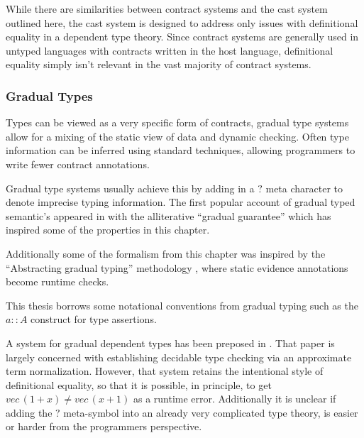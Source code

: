 While there are similarities between contract systems and the cast
system outlined here, the cast system is designed to address only
issues with definitional equality in a dependent type theory. Since
contract systems are generally used in untyped languages with contracts
written in the host language, definitional equality simply isn't relevant
in the vast majority of contract systems.

\subsubsection{Gradual Types}

Types can be viewed as a very specific form of contracts, gradual
type systems allow for a mixing of the static view of data and dynamic
checking. Often type information can be inferred using standard techniques,
allowing programmers to write fewer contract annotations. %

Gradual type systems usually achieve this by adding in a $?$ meta
character to denote imprecise typing information. The first popular
account of gradual typed semantic's appeared in \cite{siek_et_al:LIPIcs:2015:5031}
with the alliterative ``gradual guarantee'' which has inspired some
of the properties in this chapter.



Additionally some of the formalism from this chapter was inspired
by the ``Abstracting gradual typing'' methodology \cite{10.1145/2837614.2837670},
where static evidence annotations become runtime checks. %

This thesis borrows some notational conventions from gradual typing
such as the $a::A$ construct for type assertions.

A system for gradual dependent types has been preposed in \cite{10.1145/3341692}.
That paper is largely concerned with establishing decidable type checking
via an approximate term normalization. However, that system retains
the intentional style of definitional equality, so that it is possible,
in principle, to get $vec\,(1+x)\neq vec\,(x+1)$ as a runtime error.
Additionally it is unclear if adding the $?$ meta-symbol into an
already very complicated type theory, is easier or harder from the
programmers perspective.

